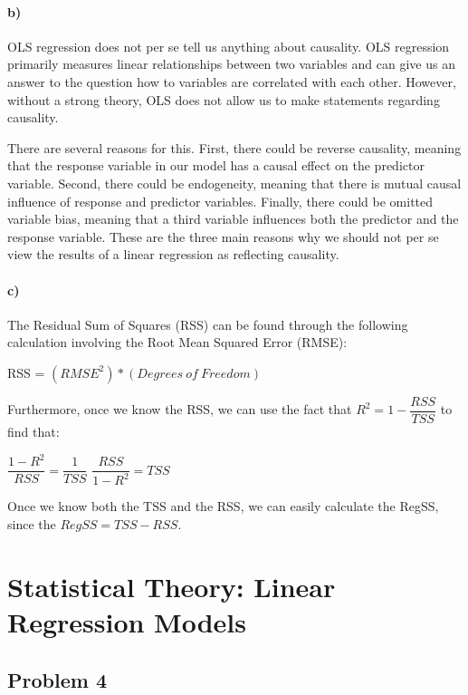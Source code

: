 \documentclass[12pt]{article}\usepackage[]{graphicx}\usepackage[]{color}
\begin{document}
\paragraph*{b)} OLS regression does not per se tell us anything about causality. OLS regression primarily measures linear relationships between two variables and can give us an answer to the question how to variables are correlated with each other. However, without a strong theory, OLS does not allow us to make statements regarding causality.

There are several reasons for this. First, there could be reverse causality, meaning that the response variable in our model has a causal effect on the predictor variable. Second, there could be endogeneity, meaning that there is mutual causal influence of response and predictor variables. Finally, there could be omitted variable bias, meaning that a third variable influences both the predictor and the response variable. These are the three main reasons why we should not per se view the results of a linear regression as reflecting causality.

\paragraph*{c)} The Residual Sum of Squares (RSS) can be found through the following calculation involving the Root Mean Squared Error (RMSE):

\bigskip

RSS = $(RMSE^2)*(Degrees\ of \ Freedom)$

\bigskip

Furthermore, once we know the RSS, we can use the fact that $R^2 = 1 - \dfrac{RSS}{TSS}$ to find that:

\bigskip

$\dfrac{1 - R^2}{RSS} = \dfrac{1}{TSS}$ \rightarrow $\dfrac{RSS}{1 - R^2} = TSS$

\bigskip

Once we know both the TSS and the RSS, we can easily calculate the RegSS, since the $RegSS = TSS - RSS$.



\section*{Statistical Theory: Linear Regression Models}

\subsection*{Problem 4}
\end{document}
